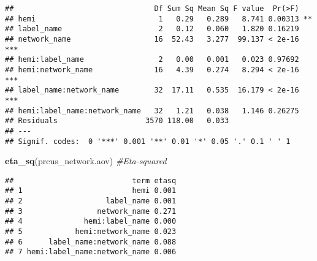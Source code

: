 \documentclass[
]{article}
\newenvironment{Shaded}{\begin{snugshade}}{\end{snugshade}}
\newcommand{\CommentTok}[1]{\textcolor[rgb]{0.56,0.35,0.01}{\textit{#1}}}
\newcommand{\DataTypeTok}[1]{\textcolor[rgb]{0.13,0.29,0.53}{#1}}
\newcommand{\KeywordTok}[1]{\textcolor[rgb]{0.13,0.29,0.53}{\textbf{#1}}}
\newcommand{\NormalTok}[1]{#1}
\newcommand{\OperatorTok}[1]{\textcolor[rgb]{0.81,0.36,0.00}{\textbf{#1}}}
\newcommand{\StringTok}[1]{\textcolor[rgb]{0.31,0.60,0.02}{#1}}
\begin{document}
\begin{Shaded}
\end{Shaded}

\begin{verbatim}
##                                Df Sum Sq Mean Sq F value  Pr(>F)    
## hemi                            1   0.29   0.289   8.741 0.00313 ** 
## label_name                      2   0.12   0.060   1.820 0.16219    
## network_name                   16  52.43   3.277  99.137 < 2e-16 ***
## hemi:label_name                 2   0.00   0.001   0.023 0.97692    
## hemi:network_name              16   4.39   0.274   8.294 < 2e-16 ***
## label_name:network_name        32  17.11   0.535  16.179 < 2e-16 ***
## hemi:label_name:network_name   32   1.21   0.038   1.146 0.26275    
## Residuals                    3570 118.00   0.033                    
## ---
## Signif. codes:  0 '***' 0.001 '**' 0.01 '*' 0.05 '.' 0.1 ' ' 1
\end{verbatim}

\begin{Shaded}
\begin{Highlighting}[]
\KeywordTok{eta_sq}\NormalTok{(prcus_network.aov) }\CommentTok{#Eta-squared}
\end{Highlighting}
\end{Shaded}

\begin{verbatim}
##                           term etasq
## 1                         hemi 0.001
## 2                   label_name 0.001
## 3                 network_name 0.271
## 4              hemi:label_name 0.000
## 5            hemi:network_name 0.023
## 6      label_name:network_name 0.088
## 7 hemi:label_name:network_name 0.006
\end{verbatim}
\end{document}
